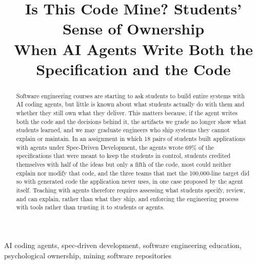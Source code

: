 \documentclass[conference]{IEEEtran}
\begin{document}
\title{Is This Code Mine? Students' Sense of Ownership\\When AI Agents Write Both the Specification and the Code}

\author{
\and
{}
\and
{}
}

\maketitle

\begin{abstract}
Software engineering courses are starting to ask students to build entire systems with AI coding agents, but little is known about what students actually do with them and whether they still own what they deliver. This matters because, if the agent writes both the code and the decisions behind it, the artifacts we grade no longer show what students learned, and we may graduate engineers who ship systems they cannot explain or maintain. In an assignment in which 18 pairs of students built applications with agents under Spec-Driven Development, the agents wrote 69\% of the specifications that were meant to keep the students in control, students credited themselves with half of the ideas but only a fifth of the code, most could neither explain nor modify that code, and the three teams that met the 100,000-line target did so with generated code the application never uses, in one case proposed by the agent itself. Teaching with agents therefore requires assessing what students specify, review, and can explain, rather than what they ship, and enforcing the engineering process with tools rather than trusting it to students or agents.
\end{abstract}

\begin{IEEEkeywords}
AI coding agents, spec-driven development, software engineering education, psychological ownership, mining software repositories
\end{IEEEkeywords}
\end{document}
